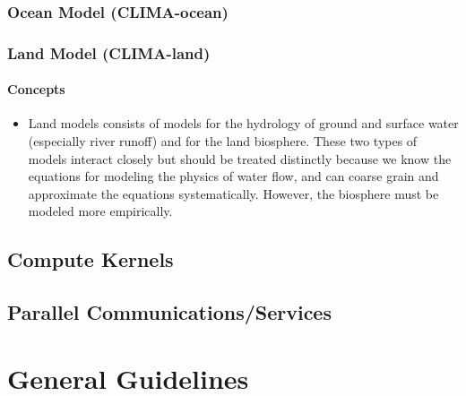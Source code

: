 \documentclass{article}
\begin{document}
\subsubsection{Ocean Model (CLIMA-ocean)}

\subsubsection{Land Model (CLIMA-land)}

\paragraph{Concepts}

\begin{itemize}
    \item Land models consists of models for the hydrology of ground and surface water (especially river runoff) and for the land biosphere. These two types of models interact closely but should be treated distinctly because we know the equations for modeling the physics of water flow, and can coarse grain and approximate the equations systematically. However, the biosphere must be modeled more empirically. 
\end{itemize}

\subsection{Compute Kernels}

\subsection{Parallel Communications/Services}

\section{General Guidelines}
\end{document}

